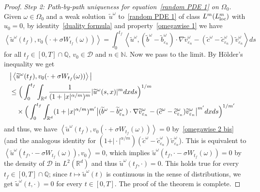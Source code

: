 \documentclass[a4paper,10pt]{article}
\newcommand\1{\mathbbm{1}}
\newcommand{\eps}{\varepsilon}
\newcommand\loc{{\rm loc}}
\numberwithin{equation}{section}
\begin{document}
\begin{proof}
\emph{Step 2: Path-by-path uniqueness for equation~\eqref{random PDE 1} on $\Omega_{0}$.} Given $\omega\in\Omega_{0}$ and a weak solution~$\widetilde{u}^\omega$ to~\eqref{random PDE 1} of class $L^{m}(L^{m}_\loc)$ with $u_{0}=0$, by identity~\eqref{duality formula} and property~\eqref{omegawise 1} we have 
\begin{equation*}
\left\langle \widetilde{u}^\omega (t_{f}),v_{0}(\cdot+\sigma W_{t_{f}}(\omega)) \right\rangle =\int_{0}^{t_{f}}\left\langle \widetilde{u}^\omega,( \widetilde{b}^\omega  -\widetilde{b}_{\eps_{n}}^\omega ) \cdot\nabla\widetilde{v}_{\eps_{n}}^\omega  -(\widetilde{c}^\omega -\widetilde{c}_{\eps_{n}}^\omega )  \widetilde{v}_{\eps_{n}}^\omega  \right\rangle ds
\end{equation*}
for all $t_{f}\in [0,T] \cap\mathbb{Q}$, $v_{0}\in\mathcal{D}$ and $n\in\mathbb{N}$. Now we pass to the limit. By H\"older's inequality we get
\begin{align*}
\lefteqn{\big\vert \left\langle \widetilde{u}^\omega (t_{f})
,v_{0}(\cdot+\sigma W_{t_{f}}(\omega))\right\rangle \big\vert } \\
&  \leq \Big( \int_{0}^{t_{f}}\int_{\mathbb{R}^{d}}\frac{1}{(1+\vert x \vert^{\alpha/m} )^{m}} \vert \widetilde{u}^\omega(s,x) \vert^{m}dxds \Big)  ^{1/m}\\
& \quad {} \times \Big( \int_{0}^{t_{f}} \int_{\mathbb{R}^{d}} (1+\vert x\vert^{\alpha/m})^{m^{\prime}} \big\vert (\widetilde{b}^\omega  -\widetilde{b}_{\eps_{n}}^\omega ) \cdot \nabla\widetilde{v}_{\eps_{n}}^\omega  -(  \widetilde{c}^\omega -\widetilde{c}_{\eps_{n}}^\omega )  \widetilde{v}_{\eps_{n}}^\omega \big\vert^{m^{\prime}}dxds \Big)^{1/m^{\prime}}
\end{align*}
and thus, we have $\left\langle \widetilde{u}^\omega(t_{f}),v_{0}(\cdot+\sigma W_{t_{f}}(\omega))\right\rangle =0$ by~\eqref{omegawise 2 bis} (and the analogous identity for $( 1+ \vert \cdot \vert^{\alpha/m}) ( \widetilde{c}^\omega -\widetilde{c}_{\eps_{n}}^\omega ) \widetilde{v}_{\eps_{n}}^\omega$). This is equivalent to $\left\langle \widetilde{u}^\omega(t_{f},\cdot-\sigma W_{t_{f}}(\omega) )  ,v_{0}\right\rangle =0$, which implies $\widetilde{u}^\omega(t_{f},\cdot-\sigma W_{t_{f}}(\omega))  =0$ by the density of $\mathcal{D}$ in $L^{2}(\mathbb{R}^{d})$ and thus $\widetilde{u}^\omega(t_{f},\cdot)  =0$. This holds true for every $t_{f}\in [0,T] \cap\mathbb{Q}$; since $t\mapsto \widetilde{u}^\omega(t)$ is continuous in the sense of distributions, we get $\widetilde{u}^\omega(t,\cdot) =0$ for every $t \in [0,T]$. The proof of the theorem is complete.
\end{proof}
\end{document}
